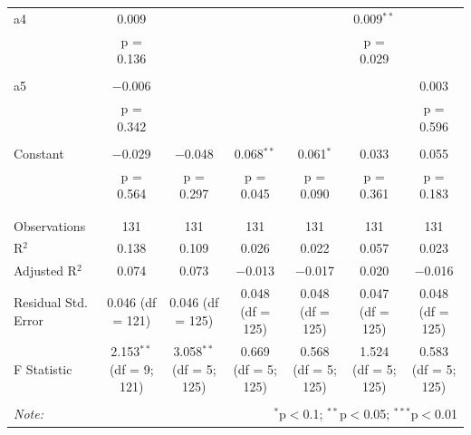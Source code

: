 \begin{table}[!htbp]
\begin{turn}{0}
\begin{tabular}{@{\extracolsep{5pt}}lcccccc}
 a4 & 0.009 &  &  &  & 0.009$^{**}$ &  \\ 
  & p = 0.136 &  &  &  & p = 0.029 &  \\ 
  & & & & & & \\ 
 a5 & $-$0.006 &  &  &  &  & 0.003 \\ 
  & p = 0.342 &  &  &  &  & p = 0.596 \\ 
  & & & & & & \\ 
 Constant & $-$0.029 & $-$0.048 & 0.068$^{**}$ & 0.061$^{*}$ & 0.033 & 0.055 \\ 
  & p = 0.564 & p = 0.297 & p = 0.045 & p = 0.090 & p = 0.361 & p = 0.183 \\ 
  & & & & & & \\ 
\hline \\[-1.8ex] 
Observations & 131 & 131 & 131 & 131 & 131 & 131 \\ 
R$^{2}$ & 0.138 & 0.109 & 0.026 & 0.022 & 0.057 & 0.023 \\ 
Adjusted R$^{2}$ & 0.074 & 0.073 & $-$0.013 & $-$0.017 & 0.020 & $-$0.016 \\ 
Residual Std. Error & 0.046 (df = 121) & 0.046 (df = 125) & 0.048 (df = 125) & 0.048 (df = 125) & 0.047 (df = 125) & 0.048 (df = 125) \\ 
F Statistic & 2.153$^{**}$ (df = 9; 121) & 3.058$^{**}$ (df = 5; 125) & 0.669 (df = 5; 125) & 0.568 (df = 5; 125) & 1.524 (df = 5; 125) & 0.583 (df = 5; 125) \\ 
\hline 
\hline \\[-1.8ex] 
\textit{Note:}  & \multicolumn{6}{r}{$^{*}$p$<$0.1; $^{**}$p$<$0.05; $^{***}$p$<$0.01} \\ 
\end{tabular} 
\end{turn}
\end{table}



